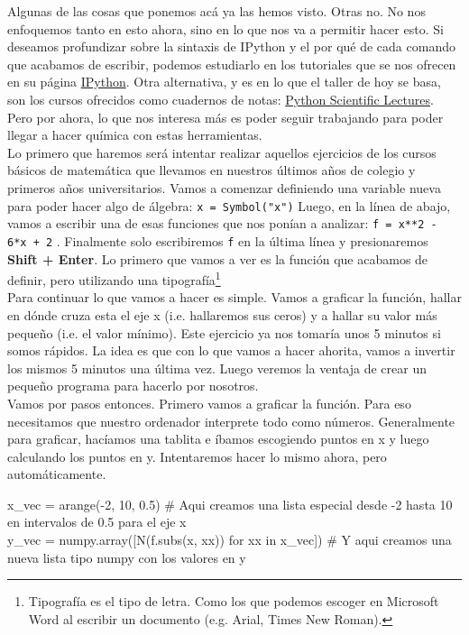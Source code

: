 \documentclass[10pt,letterpaper]{article}
\newcommand{\inlinecode}[1]{
\colorbox{light-gray}{\texttt{#1}}
}
\newenvironment{Code}
{
\begin{lrbox}{\selvestebox}%
\begin{minipage}{\dimexpr\columnwidth-2\fboxsep\relax}
\fontfamily{\ttdefault}\selectfont
}
{\end{minipage}\end{lrbox}%
\begin{center}
\colorbox{light-gray}{\usebox{\selvestebox}}
\end{center}
}
\begin{document}
Algunas de las cosas que ponemos ac\'a ya las hemos visto. Otras no. No nos enfoquemos tanto en esto ahora, sino en lo que nos va a permitir hacer esto. Si deseamos profundizar sobre la sintaxis de IPython y el por qu\'e de cada comando que acabamos de escribir, podemos estudiarlo en los tutoriales que se nos ofrecen en su p\'agina \href{http://ipython.org/}{IPython}. Otra alternativa, y es en lo que el taller de hoy se basa, son los cursos ofrecidos como cuadernos de notas: \href{https://github.com/jrjohansson/scientific-python-lectures}{Python Scientific Lectures}. Pero por ahora, lo que nos interesa m\'as es poder seguir trabajando para poder llegar a hacer qu\'imica con estas herramientas.\\

Lo primero que haremos ser\'a intentar realizar aquellos ejercicios de los cursos b\'asicos de matem\'atica que llevamos en nuestros \'ultimos a\~nos de colegio y primeros a\~nos universitarios. Vamos a comenzar definiendo una variable nueva para poder hacer algo de \'algebra: \inlinecode{x = Symbol("x")} Luego, en la l\'inea de abajo, vamos a escribir una de esas funciones que nos pon\'ian a analizar: \inlinecode{f = x**2 - 6*x + 2}. Finalmente solo escribiremos \inlinecode{f} en la \'ultima l\'inea y presionaremos \textbf{Shift + Enter}. Lo primero que vamos a ver es la funci\'on que acabamos de definir, pero utilizando una tipograf\'ia\footnote{Tipograf\'ia es el tipo de letra. Como los que podemos escoger en Microsoft Word al escribir un documento (e.g. Arial, Times New Roman).}\\

Para continuar lo que vamos a hacer es simple. Vamos a graficar la funci\'on, hallar en d\'onde cruza esta el eje x (i.e. hallaremos sus ceros) y a hallar su valor m\'as peque\~no (i.e. el valor m\'inimo). Este ejercicio ya nos tomar\'ia unos 5 minutos si somos r\'apidos. La idea es que con lo que vamos a hacer ahorita, vamos a invertir los mismos 5 minutos una \'ultima vez. Luego veremos la ventaja de crear un peque\~no programa para hacerlo por nosotros.\\

Vamos por pasos entonces. Primero vamos a graficar la funci\'on. Para eso necesitamos que nuestro ordenador interprete todo como n\'umeros. Generalmente para graficar, hac\'iamos una tablita e \'ibamos escogiendo puntos en x y luego calculando los puntos en y. Intentaremos hacer lo mismo ahora, pero autom\'aticamente.

\begin{footnotesize}
\begin{Code}
x\_vec = arange(-2, 10, 0.5) \# Aqui creamos una lista especial desde -2 hasta 10 en intervalos de 0.5 para el eje x\\
y\_vec = numpy.array([N(f.subs(x, xx)) for xx in x\_vec]) \# Y aqui creamos una nueva lista tipo numpy con los valores en y
\end{Code}
\end{footnotesize}
\end{document}
